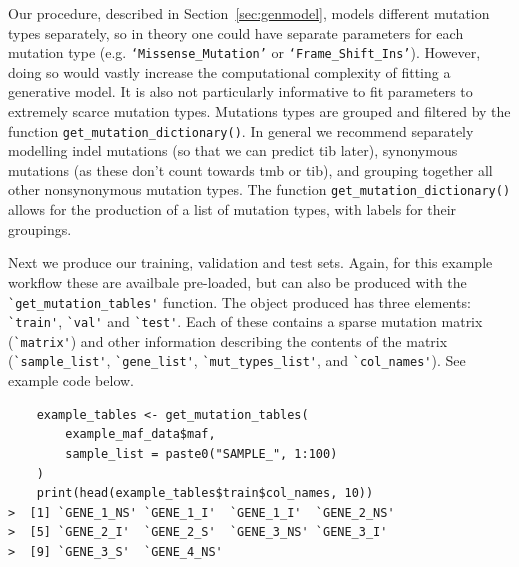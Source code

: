 \documentclass[../thesis.tex]{subfiles}
\begin{document}
Our procedure, described in Section~\ref{sec:genmodel}, models different mutation types separately, so in theory one could have separate parameters for each mutation type (e.g. \texttt{`Missense\_Mutation'} or \texttt{`Frame\_Shift\_Ins'}). However, doing so would vastly increase the computational complexity of fitting a generative model. It is also not particularly informative to fit parameters to extremely scarce mutation types. Mutations types are grouped and filtered by the function \lstinline{get_mutation_dictionary()}. In general we recommend separately modelling indel mutations (so that we can predict \gls{tib} later), synonymous mutations (as these don’t count towards \gls{tmb} or \gls{tib}), and grouping together all other nonsynonymous mutation types. The function \lstinline{get_mutation_dictionary()} allows for the production of a list of mutation types, with labels for their groupings.

Next we produce our training, validation and test sets. Again, for this example workflow these are availbale pre-loaded, but can also be produced with the \lstinline{`get_mutation_tables'} function. The object produced has three elements: \lstinline{`train'}, \lstinline{`val'} and \lstinline{`test'}. Each of these contains a sparse mutation matrix (\lstinline{`matrix'}) and other information describing the contents of the matrix (\lstinline{`sample_list'}, \lstinline{`gene_list'}, \lstinline{`mut_types_list'}, and \lstinline{`col_names'}). See example code below.

\begin{lstlisting}
    example_tables <- get_mutation_tables(
        example_maf_data$maf,
        sample_list = paste0("SAMPLE_", 1:100)
    )
    print(head(example_tables$train$col_names, 10))
>  [1] `GENE_1_NS' `GENE_1_I'  `GENE_1_I'  `GENE_2_NS' 
>  [5] `GENE_2_I'  `GENE_2_S'  `GENE_3_NS' `GENE_3_I'  
>  [9] `GENE_3_S'  `GENE_4_NS'
\end{lstlisting}
\end{document}
